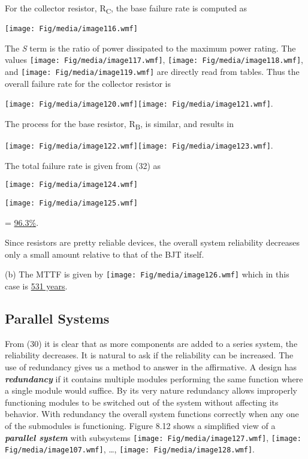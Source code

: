 For the collector resistor, R\textsubscript{C}, the base failure rate is
computed as

\texttt{[image: Fig/media/image116.wmf]}

The \emph{S} term is the ratio of power dissipated to the maximum power
rating. The values \texttt{[image: Fig/media/image117.wmf]},
\texttt{[image: Fig/media/image118.wmf]}, and
\texttt{[image: Fig/media/image119.wmf]} are directly read from tables.
Thus the overall failure rate for the collector resistor is

\texttt{[image: Fig/media/image120.wmf]}\texttt{[image: Fig/media/image121.wmf]}.

The process for the base resistor, R\textsubscript{B}, is similar, and
results in

\texttt{[image: Fig/media/image122.wmf]}\texttt{[image: Fig/media/image123.wmf]}.

The total failure rate is given from (32) as

\texttt{[image: Fig/media/image124.wmf]}

\texttt{[image: Fig/media/image125.wmf]}

= \ul{96.3\%}.

Since resistors are pretty reliable devices, the overall system
reliability decreases only a small amount relative to that of the BJT
itself.

(b) The MTTF is given by \texttt{[image: Fig/media/image126.wmf]} which
in this case is \ul{531 years}.

\subsection{Parallel Systems}\label{parallel-systems}

From (30) it is clear that as more components are added to a series
system, the reliability decreases. It is natural to ask if the
reliability can be increased. The use of redundancy gives us a method to
answer in the affirmative. A design has \emph{\textbf{redundancy}} if it
contains multiple modules performing the same function where a single
module would suffice. By its very nature redundancy allows improperly
functioning modules to be switched out of the system without affecting
its behavior. With redundancy the overall system functions correctly
when any one of the submodules is functioning. Figure 8.12 shows a
simplified view of a \emph{\textbf{parallel system}} with subsystems
\texttt{[image: Fig/media/image127.wmf]},
\texttt{[image: Fig/media/image107.wmf]}, \ldots,
\texttt{[image: Fig/media/image128.wmf]}.

